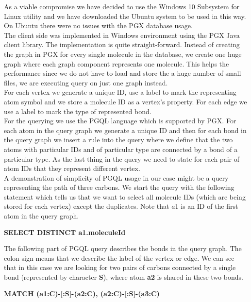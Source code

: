 {As a viable compromise we have decided to use the Windows 10 Subsystem for Linux utility \cite{wsl} and we have downloaded the Ubuntu system to be used in this way. On Ubuntu there were no issues with the PGX database usage.\\

The client side was implemented in Windows environment using the PGX Java client library. The implementation is quite straight-forward. Instead of creating the graph in PGX for every single molecule in the database, we create one huge graph where each graph component represents one molecule. This helps the performance since we do not have to load and store the a huge number of small files, we are executing query on just one graph instead.\\

For each vertex we generate a unique ID, use a label to mark the representing atom symbol and we store a molecule ID as a vertex's property. For each edge we use a label to mark the type of represented bond.\\

For the querying we use the PGQL language which is supported by PGX. For each atom in the query graph we generate a unique ID and then for each bond in the query graph we insert a rule into the query where we define that the two atoms with particular IDs and of particular type are connected by a bond of a particular type. As the last thing in the query we need to state for each pair of atom IDs that they represent different vertex.\\

A demonstration of simplicity of PGQL usage in our case might be a query representing the path of three carbons. We start the query with the following statement which tells us that we want to select all molecule IDs (which are being stored for each vertex) except the duplicates. Note that $a1$ is an ID of the first atom in the query graph.

\begin{center}
	\textbf{SELECT DISTINCT a1.moleculeId}
\end{center}

The following part of PGQL query describes the bonds in the query graph. The colon sign means that we describe the label of the vertex or edge. We can see that in this case we are looking for two pairs of carbons connected by a single bond (represented by character \textbf{S}), where atom \textbf{a2} is shared in these two bonds.

\begin{center}
	\textbf{MATCH (a1:C)-[:S]-(a2:C), (a2:C)-[:S]-(a3:C)}
\end{center}

}
